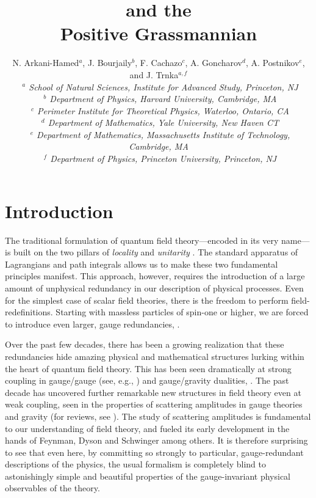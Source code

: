 \documentclass[12pt,hyperref,compress]{JHEP3}
\title{\hspace{-0.0cm}{\LARGE Scattering Amplitudes} {\Large and the}\\ {\LARGE Positive Grassmannian}}
\author{\vspace{-.5cm}N. Arkani-Hamed$^{a}$, J. Bourjaily$^{b}$, F. Cachazo$^{c}$, A. Goncharov$^{d}$, A. Postnikov$^{e}$, and J. Trnka$^{a,f}$\\
{\footnotesize
{\it $^{\!\!\phantom{f}a}$ School of Natural Sciences, Institute for Advanced Study, Princeton, NJ}\\
{\it $^{\!\!\phantom{f}b}$ Department of Physics, Harvard University, Cambridge, MA}\\
{\it $^{\!\!\phantom{f}c}$ Perimeter Institute for Theoretical Physics, Waterloo, Ontario, CA}\\
{\it $^{\!\!\phantom{f}d}$ Department of Mathematics, Yale University, New Haven CT}\\
{\it $^{\!\!\phantom{f}e}$  Department of Mathematics, Massachusetts Institute of Technology, Cambridge, MA}\\
{\it $^{\!\!\phantom{f}f}$ Department of Physics, Princeton University, Princeton,
NJ}}\vspace{-.5cm}} %
\begin{document}
\newpage
\section{Introduction}\label{introduction_section}

The traditional formulation of quantum field theory---encoded in its very name---is built on the two pillars of {\it locality}  and {\it unitarity} \cite{Weinberg:1995mt}. The standard apparatus of Lagrangians and path integrals allows us to make these two fundamental principles manifest. This approach, however, requires the introduction of a large amount of unphysical redundancy in our description of physical processes. Even for the simplest case of scalar field theories, there is the freedom to perform field-redefinitions. Starting with massless particles of spin-one or higher, we are forced to introduce even larger, gauge redundancies, \cite{Weinberg:1995mt}.

Over the past few decades, there has been a  growing realization that these redundancies hide amazing physical and mathematical structures lurking within the heart of quantum field theory. This has been seen dramatically at strong coupling in gauge/gauge (see, e.g., \cite{Seiberg:1994rs,Seiberg:1994pq,Kapustin:2006pk}) and gauge/gravity dualities, \cite{Maldacena:1997re}. The past decade has uncovered further remarkable new structures in field theory even at weak coupling, seen in the properties of scattering amplitudes in gauge theories and gravity (for reviews, see \cite{Mangano:1990by,Dixon:1996wi,Cachazo:2005ga,Bern:2007dw,Feng:2011np,GreyBook}). The study of scattering amplitudes is fundamental to our understanding of field theory, and  fueled its early development in the hands of Feynman, Dyson and Schwinger among others. It is therefore surprising to see that even here, by committing so strongly to particular, gauge-redundant descriptions of the physics, the usual formalism is completely blind to astonishingly simple and beautiful properties of the gauge-invariant physical observables of the theory.
\end{document}
